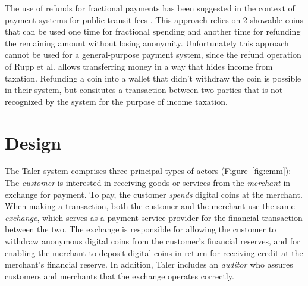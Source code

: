 \documentclass[sigconf, authordraft]{acmart}
\begin{document}



The use of refunds for fractional payments has been suggested in the context of
payment systems for public transit fees \cite{rupp2013p4r}.  This approach
relies on 2-showable coins that can be used one time for fractional spending
and another time for refunding the remaining amount without losing anonymity.
Unfortunately this approach cannot be used for a general-purpose payment
system, since the refund operation of Rupp et al. allows transferring money
in a way that hides income from taxation.  Refunding a coin into a wallet that
didn't withdraw the coin is possible in their system, but consitutes a
transaction between two parties that is not recognized by the system for the
purpose of income taxation.


\section{Design}

The Taler system comprises three principal types of actors
(Figure~\ref{fig:cmm}): The \emph{customer} is interested in receiving
goods or services from the \emph{merchant} in exchange for payment.
To pay, the customer {\em spends} digital coins at the merchant.  When
making a transaction, both the customer and the merchant use the same
\emph{exchange}, which serves as a payment service provider for the
financial transaction between the two.  The exchange is responsible
for allowing the customer to withdraw anonymous digital coins from the
customer's financial reserves, and for enabling the merchant to
deposit digital coins in return for receiving credit at the merchant's
financial reserve.  In addition, Taler includes an \emph{auditor} who
assures customers and merchants that the exchange operates correctly.
\end{document}
